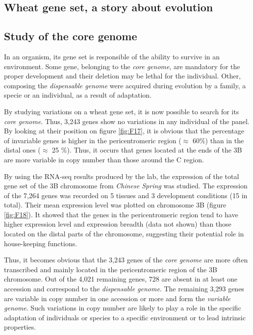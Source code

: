 \documentclass[a4paper, 12pt]{article}
\begin{document}
\begin{onehalfspace}
    \section{Wheat gene set, a story about evolution} 
    
        \subsection{Study of the core genome}
        
In an organism, its gene set is responsible of the ability to survive in an environment. Some gene, belonging to the \textit{core genome}, are mandatory for the proper development and their deletion may be lethal for the individual. Other, composing the \textit{dispensable genome} were acquired during evolution by a family, a specie or an individual, as a result of adaptation.

By studying variations on a wheat gene set, it is now possible to search for its \textit{core genome}. Thus, 3,243 genes show no variations in any individual of the panel. By looking at their position on figure \ref{fig:F17}, it is obvious that the percentage of invariable genes is higher in the pericentromeric region ($\approx$ 60\%) than in the distal ones ($\approx$ 25 \%). Thus, it occurs that genes located at the ends of the 3B are more variable in copy number than those around the C region. 

By using the RNA-seq results produced by the lab, the expression of the total gene set of the 3B chromosome from \textit{Chinese Spring} was studied. The expression of the 7,264 genes was recorded on 5 tissues and 3 development conditions (15 in total). Their mean expression level was plotted on chromosome 3B (figure \ref{fig:F18}). It showed that the genes in the pericentromeric region tend to have higher expression level and expression breadth (data not shown) than those located on the distal parts of the chromosome, suggesting their potential role in house-keeping functions.

Thus, it becomes obvious that the 3,243 genes of the \textit{core genome} are more often transcribed and mainly located in the pericentromeric region of the 3B chromosome. Out of the 4,021 remaining genes, 728 are absent in at least one accession and correspond to the \textit{dispensable genome}. The remaining 3,293 genes are variable in copy number in one accession or more and form the \textit{variable genome}. Such variations in copy number are likely to play a role in the specific adaptation of individuals or species to a specific environment  or to lead intrinsic properties.


\end{onehalfspace}
\end{document}
